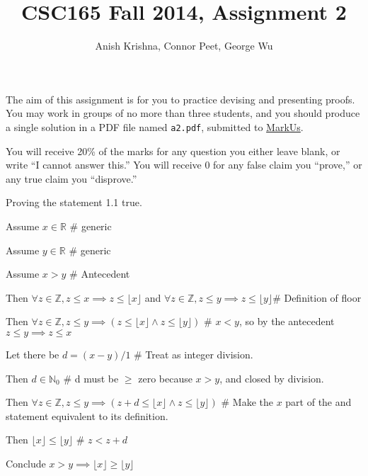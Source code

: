 \documentclass{article}
\title{CSC165 Fall 2014, Assignment 2}
\author{Anish Krishna, Connor Peet, George Wu}
\newcommand{\floor}[1]{\lfloor #1\rfloor}
\begin{document}
\maketitle
\noindent
The aim of this assignment is for you to practice devising and
presenting proofs.  You may work in groups of no more than three
students, and you should produce a single solution in a PDF file named
\texttt{a2.pdf}, submitted to
\href{https://markus.cdf.toronto.edu/csc165-2014-09}{MarkUs}.

You will receive 20\% of the marks for any question you either leave
blank, or write ``I cannot answer this.''  You will receive 0 for any
false claim you ``prove,'' or any true claim you ``disprove.''

\begin{enumerate}
\item Proving the statement 1.1 true.
    \begin{description}
    \item Assume $x \in \mathbb{R}$ \# generic
        \begin{description}
        \item Assume $y \in \mathbb{R}$ \# generic
            \begin{description}
            \item Assume $x > y$ \# Antecedent
                \begin{description}
                \item Then $\forall z \in \mathbb{Z}, z \leq x \implies z \leq \floor{x}$ and $\forall z \in \mathbb{Z}, z \leq y \implies z \leq \floor{y}$\# Definition of floor
                \item Then $\forall z \in \mathbb{Z}, z \leq y \implies (z \leq \floor{x} \land z \leq \floor{y})$ \# $x < y$, so by the antecedent $z \leq y \implies z \leq x$
                \item Let there be $d = (x - y) / 1$ \# Treat as integer division.
                \item Then $d \in \mathbb{N}_0$ \# d must be $\geq$ zero because $x > y$, and closed by division.
                \item Then $\forall z \in \mathbb{Z}, z \leq y \implies (z + d \leq \floor{x} \land z \leq \floor{y})$ \# Make the $x$ part of the and statement equivalent to its definition.
                \item Then $\floor{x} \leq \floor{y}$ \# $z < z + d$
                \end{description}
            \item Conclude $x > y \implies \floor{x} \geq \floor{y}$

\end{description}
\end{description}
\end{description}
\end{enumerate}
\end{document}
